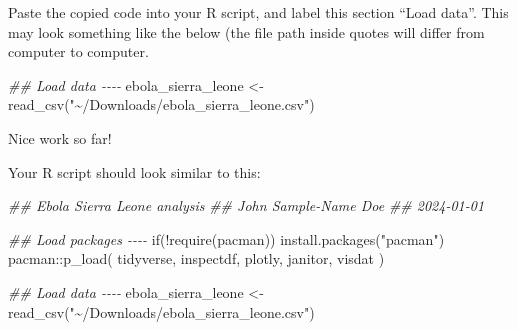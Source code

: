 \documentclass[
  letterpaper,
  DIV=11,
  numbers=noendperiod]{scrreprt}
\newenvironment{Shaded}{\begin{snugshade}}{\end{snugshade}}
\newcommand{\ControlFlowTok}[1]{\textcolor[rgb]{0.00,0.23,0.31}{#1}}
\newcommand{\DocumentationTok}[1]{\textcolor[rgb]{0.37,0.37,0.37}{\textit{#1}}}
\newcommand{\FunctionTok}[1]{\textcolor[rgb]{0.28,0.35,0.67}{#1}}
\newcommand{\NormalTok}[1]{\textcolor[rgb]{0.00,0.23,0.31}{#1}}
\newcommand{\OtherTok}[1]{\textcolor[rgb]{0.00,0.23,0.31}{#1}}
\newcommand{\SpecialCharTok}[1]{\textcolor[rgb]{0.37,0.37,0.37}{#1}}
\newcommand{\StringTok}[1]{\textcolor[rgb]{0.13,0.47,0.30}{#1}}
\begin{document}
Paste the copied code into your R script, and label this section ``Load
data''. This may look something like the below (the file path inside
quotes will differ from computer to computer.

\begin{Shaded}
\begin{Highlighting}[]
\DocumentationTok{\#\# Load data {-}{-}{-}{-}}
\NormalTok{ebola\_sierra\_leone }\OtherTok{\textless{}{-}} \FunctionTok{read\_csv}\NormalTok{(}\StringTok{"\textasciitilde{}/Downloads/ebola\_sierra\_leone.csv"}\NormalTok{)}
\end{Highlighting}
\end{Shaded}

\begin{tcolorbox}[enhanced jigsaw, colframe=quarto-callout-note-color-frame, rightrule=.15mm, opacityback=0, breakable, coltitle=black, colbacktitle=quarto-callout-note-color!10!white, bottomrule=.15mm, leftrule=.75mm, toprule=.15mm, arc=.35mm, bottomtitle=1mm, colback=white, left=2mm, opacitybacktitle=0.6, titlerule=0mm, title=\textcolor{quarto-callout-note-color}{\faInfo}\hspace{0.5em}{Recap}, toptitle=1mm]

Nice work so far!

Your R script should look similar to this:

\begin{Shaded}
\begin{Highlighting}[]
\DocumentationTok{\#\# Ebola Sierra Leone analysis}
\DocumentationTok{\#\# John Sample{-}Name Doe}
\DocumentationTok{\#\# 2024{-}01{-}01}

\DocumentationTok{\#\# Load packages {-}{-}{-}{-}}
\ControlFlowTok{if}\NormalTok{(}\SpecialCharTok{!}\FunctionTok{require}\NormalTok{(pacman)) }\FunctionTok{install.packages}\NormalTok{(}\StringTok{"pacman"}\NormalTok{)}
\NormalTok{pacman}\SpecialCharTok{::}\FunctionTok{p\_load}\NormalTok{(}
\NormalTok{  tidyverse,}
\NormalTok{  inspectdf,}
\NormalTok{  plotly,}
\NormalTok{  janitor,}
\NormalTok{  visdat}
\NormalTok{)}

\DocumentationTok{\#\# Load data {-}{-}{-}{-}}
\NormalTok{ebola\_sierra\_leone }\OtherTok{\textless{}{-}} \FunctionTok{read\_csv}\NormalTok{(}\StringTok{"\textasciitilde{}/Downloads/ebola\_sierra\_leone.csv"}\NormalTok{)}
\end{Highlighting}
\end{Shaded}

\end{tcolorbox}
\end{document}
